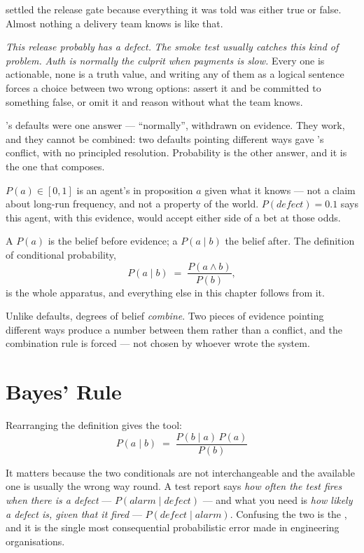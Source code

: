  settled the release gate because everything it was told was
either true or false. Almost nothing a delivery team knows is like that.

\emph{This release probably has a defect.} \emph{The smoke test usually catches
this kind of problem.} \emph{Auth is normally the culprit when payments is slow.}
Every one is actionable, none is a truth value, and writing any of them as a
logical sentence forces a choice between two wrong options: assert it and be
committed to something false, or omit it and reason without what the team knows.

's defaults were one answer --- ``normally'', withdrawn on evidence. They
work, and they cannot be combined: two defaults pointing different ways gave
's conflict, with no principled resolution. Probability is the other
answer, and it is the one that composes.

\begin{definitionbox}
$P(a) \in [0,1]$ is an agent's  in proposition $a$ given
what it knows --- not a claim about long-run frequency, and not a property of the
world. $P(\mathit{defect}) = 0.1$ says this agent, with this evidence, would accept
either side of a bet at those odds.

A  $P(a)$ is the belief before evidence; a 
$P(a \mid b)$ the belief after. The definition of conditional probability,
\[
  P(a \mid b) \;=\; \frac{P(a \wedge b)}{P(b)},
\]
is the whole apparatus, and everything else in this chapter follows from it.
\end{definitionbox}

Unlike defaults, degrees of belief \emph{combine}. Two pieces of evidence pointing
different ways produce a number between them rather than a conflict, and the
combination rule is forced --- not chosen by whoever wrote the system.

\section{Bayes' Rule}

Rearranging the definition gives the tool:
\[
  P(a \mid b) \;=\; \frac{P(b \mid a)\, P(a)}{P(b)}
\]

It matters because the two conditionals are not interchangeable and the available
one is usually the wrong way round. A test report says \emph{how often the test
fires when there is a defect} --- $P(\mathit{alarm} \mid \mathit{defect})$ --- and
what you need is \emph{how likely a defect is, given that it fired} ---
$P(\mathit{defect} \mid \mathit{alarm})$. Confusing the two is the , and it is the single most consequential probabilistic error made in
engineering organisations.

